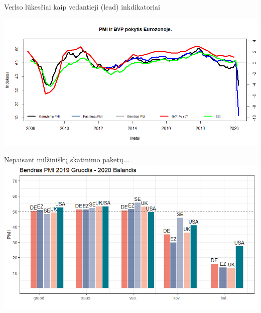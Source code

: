 \documentclass[aspectratio=169, 11pt]{beamer}
\begin{document}
\begin{frame}{Verlso lūkesčiai kaip vedantieji (lead) inkdikatoriai}
\begin{scriptsize}
\end{scriptsize}
\centering
\includegraphics[scale=0.575]{Rplot07.png}
\end{frame}

\begin{frame}{Nepaisant milžiniškų skatinimo paketų...}
\centering
\includegraphics[scale=0.65]{Rplot06.png}
\end{frame}
\end{document}
